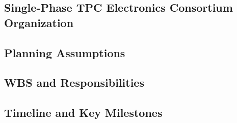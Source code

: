 \subsection{Single-Phase TPC Electronics Consortium Organization}
\label{sec:fdsp-tpc-elec-org-consort}


\subsection{Planning Assumptions}
\label{sec:fdsp-tpc-elec-org-assmp}


\subsection{WBS and Responsibilities}
\label{sec:fdsp-tpc-elec-org-wbs}


\subsection{Timeline and Key Milestones}
\label{sec:fdsp-tpc-elec-org-timeline}

